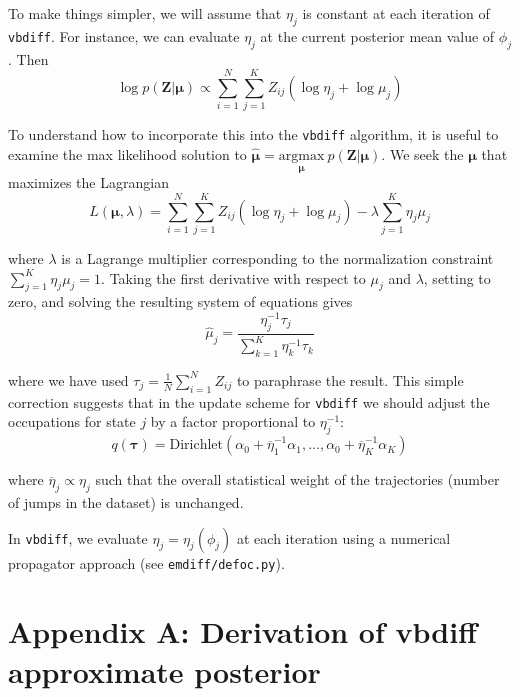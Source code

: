 \documentclass{article}
\let\vec\boldsymbol
\begin{document}
To make things simpler, we will assume that $\eta_{j}$ is constant
at each iteration of \verb|vbdiff|. For instance, we can 
evaluate $\eta_{j}$ at the current posterior mean value of $\phi_{j}$.
Then
\[
    \log p \left( \vec{Z} | \boldsymbol{\mu} \right) \propto \sum\limits_{i=1}^{N} \sum\limits_{j=1}^{K} Z_{ij} \left(
        \log \eta_{j} + \log \mu_{j}
    \right)
\]

To understand how to incorporate this into the \verb|vbdiff|
algorithm, it is useful to examine the max likelihood solution to
$\hat{\boldsymbol{\mu}} = \underset{\boldsymbol{\mu}}{\text{argmax}} \: p \left( \vec{Z} | \boldsymbol{\mu} \right)$. 
We seek the $\boldsymbol{\mu}$ that maximizes the Lagrangian
\[
    L(\boldsymbol{\mu}, \lambda) = \sum\limits_{i=1}^{N} \sum\limits_{j=1}^{K} Z_{ij} \left(
        \log \eta_{j} + \log \mu_{j}
    \right) - \lambda \sum\limits_{j=1}^{K} \eta_{j} \mu_{j}
\]

where $\lambda$ is a Lagrange multiplier corresponding to the
normalization constraint $\sum_{j=1}^{K} \eta_{j} \mu_{j} = 1$.
Taking the first derivative with respect to $\mu_{j}$ and $\lambda$,
setting to zero, and solving the resulting system of equations gives
\[
    \hat{\mu}_{j} = \frac{\eta_{j}^{-1} \tau_{j}}{\sum\limits_{k=1}^{K} \eta_{k}^{-1} \tau_{k}}
\]

where we have used $\tau_{j} = \frac{1}{N} \sum\limits_{i=1}^{N} Z_{ij}$
to paraphrase the result. This simple correction suggests that
in the update scheme for \verb|vbdiff| we should adjust the
occupations for state $j$ by a factor proportional to $\eta_{j}^{-1}$:
\[
    q \left( \boldsymbol{\tau} \right) = \text{Dirichlet} \left(
        \alpha_{0} + \overline{\eta}_{1}^{-1} \alpha_{1},
        ...,
        \alpha_{0} + \overline{\eta}_{K}^{-1} \alpha_{K}
    \right)
\]

where $\overline{\eta}_{j} \propto \eta_{j}$ such that the overall
statistical weight of the trajectories (number of jumps in the dataset)
is unchanged. \newline

In \verb|vbdiff|, we evaluate $\eta_{j} = \eta_{j} (\phi_{j})$
at each iteration using a numerical propagator approach
(see \verb|emdiff/defoc.py|).

\appendix

\section{Appendix A: Derivation of vbdiff approximate posterior}\label{appendix:derivation_approx_posterior}
\end{document}
